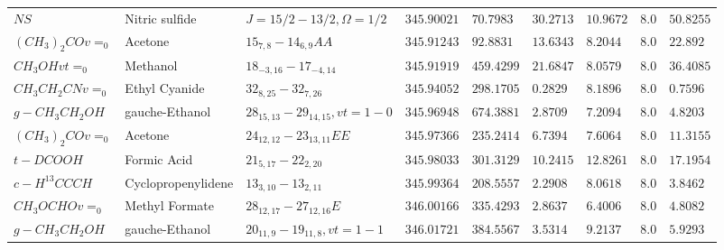 \documentclass[10pt]{article}
\begin{document}
\begin{table}[htb]
\begin{tabular}{l l l l l l l l l}
$NS$ & Nitric sulfide & $J=15/2-13/2,\Omega=1/2$ & $345.90021$ & $70.7983$ & $30.2713$ & $10.9672$ & $8.0$ & $50.8255$\\
$(CH_{3})_{2}COv=_{0}$ & Acetone & $15_{7,8}-14_{6,9}AA$ & $345.91243$ & $92.8831$ & $13.6343$ & $8.2044$ & $8.0$ & $22.892$\\
$CH_{3}OHvt=_{0}$ & Methanol & $18_{-3,16}-17_{-4,14}$ & $345.91919$ & $459.4299$ & $21.6847$ & $8.0579$ & $8.0$ & $36.4085$\\
$CH_{3}CH_{2}CNv=_{0}$ & Ethyl Cyanide & $32_{8,25}-32_{7,26}$ & $345.94052$ & $298.1705$ & $0.2829$ & $8.1896$ & $8.0$ & $0.7596$\\
$g-CH_{3}CH_{2}OH$ & gauche-Ethanol & $28_{15,13}-29_{14,15},vt=1-0$ & $345.96948$ & $674.3881$ & $2.8709$ & $7.2094$ & $8.0$ & $4.8203$\\
$(CH_{3})_{2}COv=_{0}$ & Acetone & $24_{12,12}-23_{13,11}EE$ & $345.97366$ & $235.2414$ & $6.7394$ & $7.6064$ & $8.0$ & $11.3155$\\
$t-DCOOH$ & Formic Acid & $21_{5,17}-22_{2,20}$ & $345.98033$ & $301.3129$ & $10.2415$ & $12.8261$ & $8.0$ & $17.1954$\\
$c-H^{13}CCCH$ & Cyclopropenylidene & $13_{3,10}-13_{2,11}$ & $345.99364$ & $208.5557$ & $2.2908$ & $8.0618$ & $8.0$ & $3.8462$\\
$CH_{3}OCHOv=_{0}$ & Methyl Formate & $28_{12,17}-27_{12,16}E$ & $346.00166$ & $335.4293$ & $2.8637$ & $6.4006$ & $8.0$ & $4.8082$\\
$g-CH_{3}CH_{2}OH$ & gauche-Ethanol & $20_{11,9}-19_{11,8},vt=1-1$ & $346.01721$ & $384.5567$ & $3.5314$ & $9.2137$ & $8.0$ & $5.9293$\\
\hline



    \end{tabular}
\end{table}
\end{document}
